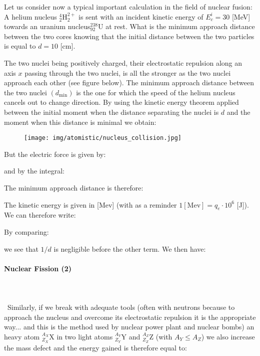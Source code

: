 	Let us consider now a typical important calculation in the field of nuclear fusion: A helium nucleus ${ }_{2}^{4} \mathrm{H}_{2}^{2+}$ is sent with an incident kinetic energy of  $E_{c}^{i}=30$ [MeV] towards an uranium nucleus${ }_{92}^{238} \mathrm{U}$ at rest. What is the minimum approach distance between the two cores knowing that the initial distance between the two particles is equal to $d=10$ [cm].

	The two nuclei being positively charged, their electrostatic repulsion along an axis $x$ passing through the two nuclei, is all the stronger as the two nuclei approach each other (see figure below). The minimum approach distance between the two nuclei $\left(d_{\min }\right)$ is the one for which the speed of the helium nucleus cancels out to change direction. By using the kinetic energy theorem applied between the initial moment when the distance separating the nuclei is $d$ and the moment when this distance is minimal we obtain:
	\begin{figure}[H]
		\centering
		\texttt{[image: img/atomistic/nucleus\_collision.jpg]}
	\end{figure}
	
	But the electric force is given by:
	
	and by the integral:
	
	The minimum approach distance is therefore:
	
	The kinetic energy is given in [Mev] (with as a reminder $1 [\text{Mev}]=q_e \cdot 10^{6}$ [J]). We can therefore write:
	
	By comparing:
	
	we see that $1/d$ is negligible before the other term. We then have:
	
	
	
	\paragraph{Nuclear Fission (2)}\mbox{}\\\\\
	Similarly, if we break with adequate tools (often with neutrons because to approach the nucleus and overcome its electrostatic repulsion it is the appropriate way... and this is the method used by nuclear power plant and nuclear bombs) an heavy atom $_{Z_X}^{A_X}\mathrm{X}$ in two light atoms $_{Z_Y}^{A_Y}\mathrm{Y}$ and $_{Z_Z}^{A_Z}\mathrm{Z}$ (with $A_Y\le A_Z$) we also increase the mass defect and the energy gained is therefore equal to:
	

